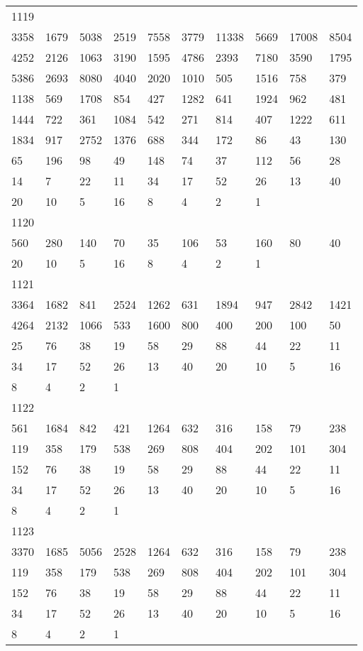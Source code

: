 \begin{longtable}{*{10}{l}}
1119&&&&&&&&&\\
3358& 1679& 5038& 2519& 7558& 3779& 11338& 5669& 17008& 8504\\
4252& 2126& 1063& 3190& 1595& 4786& 2393& 7180& 3590& 1795\\
5386& 2693& 8080& 4040& 2020& 1010& 505& 1516& 758& 379\\
1138& 569& 1708& 854& 427& 1282& 641& 1924& 962& 481\\
1444& 722& 361& 1084& 542& 271& 814& 407& 1222& 611\\
1834& 917& 2752& 1376& 688& 344& 172& 86& 43& 130\\
65& 196& 98& 49& 148& 74& 37& 112& 56& 28\\
14& 7& 22& 11& 34& 17& 52& 26& 13& 40\\
20& 10& 5& 16& 8& 4& 2& 1& \\

1120&&&&&&&&&\\
560& 280& 140& 70& 35& 106& 53& 160& 80& 40\\
20& 10& 5& 16& 8& 4& 2& 1& \\

1121&&&&&&&&&\\
3364& 1682& 841& 2524& 1262& 631& 1894& 947& 2842& 1421\\
4264& 2132& 1066& 533& 1600& 800& 400& 200& 100& 50\\
25& 76& 38& 19& 58& 29& 88& 44& 22& 11\\
34& 17& 52& 26& 13& 40& 20& 10& 5& 16\\
8& 4& 2& 1& \\

1122&&&&&&&&&\\
561& 1684& 842& 421& 1264& 632& 316& 158& 79& 238\\
119& 358& 179& 538& 269& 808& 404& 202& 101& 304\\
152& 76& 38& 19& 58& 29& 88& 44& 22& 11\\
34& 17& 52& 26& 13& 40& 20& 10& 5& 16\\
8& 4& 2& 1& \\

1123&&&&&&&&&\\
3370& 1685& 5056& 2528& 1264& 632& 316& 158& 79& 238\\
119& 358& 179& 538& 269& 808& 404& 202& 101& 304\\
152& 76& 38& 19& 58& 29& 88& 44& 22& 11\\
34& 17& 52& 26& 13& 40& 20& 10& 5& 16\\
8& 4& 2& 1& \\


\end{longtable}
